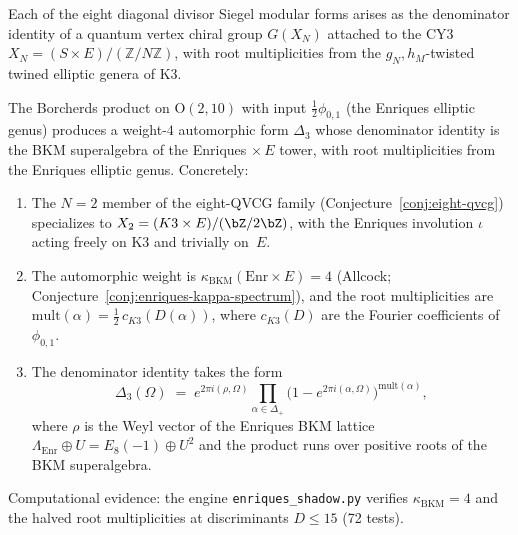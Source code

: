 \begin{conjecture}
\label{conj:eight-qvcg}
Each of the eight diagonal divisor Siegel modular forms arises as the denominator identity of a quantum vertex chiral group $G(X_N)$ attached to the CY3 $X_N = (S \times E)/(\mathbb{Z}/N\mathbb{Z})$, with root multiplicities from the $g_N, h_M$-twisted twined elliptic genera of K3.
\end{conjecture}

\begin{conjecture}
\label{conj:enriques-qvcg}
\ClaimStatusConjectured{}
The Borcherds product on $\mathrm{O}(2, 10)$ with input
$\frac{1}{2}\phi_{0,1}$ (the Enriques elliptic genus) produces a
weight-$4$ automorphic form $\Delta_3$ whose denominator identity is
the BKM superalgebra of the Enriques $\times\, E$ tower, with root
multiplicities from the Enriques elliptic genus.  Concretely:
\begin{enumerate}[label=\textup{(\roman*)}]
\item
The $N = 2$ member of the eight-QVCG family
(Conjecture~\textup{\ref{conj:eight-qvcg}}) specializes to
$X_2 = (K3 \times E)/(\bZ/2\bZ)$, with the Enriques involution
$\iota$ acting freely on K3 and trivially on~$E$.
\item
The automorphic weight is
$\kappa_{\mathrm{BKM}}(\mathrm{Enr} \times E) = 4$ (Allcock;
Conjecture~\textup{\ref{conj:enriques-kappa-spectrum}}), and
the root multiplicities are
$\mathrm{mult}(\alpha) = \tfrac{1}{2}\,c_{K3}(D(\alpha))$, where
$c_{K3}(D)$ are the Fourier coefficients of $\phi_{0,1}$.
\item
The denominator identity takes the form
\[
\Delta_3(\Omega)
\;=\;
e^{2\pi i (\rho, \Omega)}
\prod_{\alpha \in \Delta_+}
\bigl(1 - e^{2\pi i (\alpha, \Omega)}\bigr)^{\mathrm{mult}(\alpha)},
\]
where $\rho$ is the Weyl vector of the Enriques BKM lattice
$\Lambda_{\mathrm{Enr}} \oplus U = E_8(-1) \oplus U^2$ and the
product runs over positive roots of the BKM superalgebra.
\end{enumerate}
Computational evidence: the engine \texttt{enriques\_shadow.py}
verifies $\kappa_{\mathrm{BKM}} = 4$ and the halved root
multiplicities at discriminants $D \leq 15$ (72 tests).
\end{conjecture}


